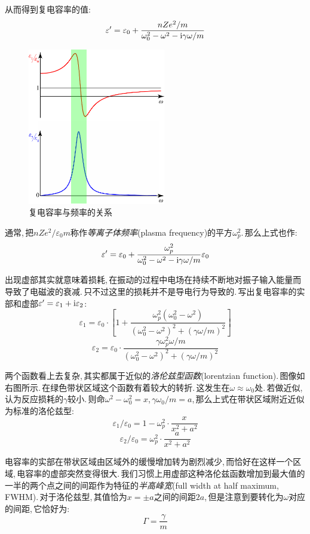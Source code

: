 从而得到复电容率的值:
\[\varepsilon'=\varepsilon_0+\frac{nZe^2/m}{\omega_0^2-\omega^2-{\rm i}\gamma\omega/m}\]

\begin{figure}
\centering
\vspace{-15pt}
\includegraphics[width=6cm]{image/18-1-1.png}
\caption{复电容率与频率的关系}
\end{figure}
通常,\,把$nZe^2/\varepsilon_0 m$称作\emph{等离子体频率}(plasma frequency)的平方$\omega_p^2$.\,那么上式也作:
\[\varepsilon'=\varepsilon_0+\frac{\omega_p^2}{\omega_0^2-\omega^2-{\rm i}\gamma\omega/m}\varepsilon_0\]

出现虚部其实就意味着损耗,\,在振动的过程中电场在持续不断地对振子输入能量而导致了电磁波的衰减.\,只不过这里的损耗并不是导电行为导致的.\,写出复电容率的实部和虚部$\varepsilon'=\varepsilon_1+{\rm i}\varepsilon_2$:
\[\varepsilon_1=\varepsilon_0\cdot\left[1+\frac{\omega_p^2(\omega_0^2-\omega^2)}{(\omega_0^2-\omega^2)^2+(\gamma\omega/m)^2}\right]\]
\[\varepsilon_2=\varepsilon_0\cdot\frac{\gamma\omega_p^2\omega/m}{(\omega_0^2-\omega^2)^2+(\gamma\omega/m)^2}\]

两个函数看上去复杂,\,其实都属于近似的\emph{洛伦兹型函数}(lorentzian function).\,图像如右图所示.\,在绿色带状区域这个函数有着较大的转折.\,这发生在$\omega\approx \omega_0$处.\,若做近似,\,认为反应损耗的$\gamma$较小.\,则命$\omega^2-\omega_0^2=x$,\,$\gamma\omega_0/m=a$,\,那么上式在带状区域附近近似为标准的洛伦兹型:
\[\varepsilon_1/\varepsilon_0=1-\omega_p^2\cdot \frac{x}{x^2+a^2}\]
\[\varepsilon_2/\varepsilon_0=\omega_p^2\cdot\frac{a}{x^2+a^2}\]

电容率的实部在带状区域由区域外的缓慢增加转为剧烈减少,\,而恰好在这样一个区域,\,电容率的虚部突然变得很大.\,我们习惯上用虚部这种洛伦兹函数增加到最大值的一半的两个点之间的间距作为特征的\emph{半高峰宽}(full width at half maximum,\,FWHM).\,对于洛伦兹型,\,其值恰为$x=\pm a$之间的间距$2a$,\,但是注意到要转化为$\omega$对应的间距,\,它恰好为:
\[\Gamma=\frac{\gamma}{m}\]

